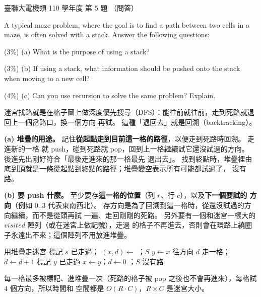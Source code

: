 \begin{pastexam}[label={px:ust-110-ee-ds-05}]{臺聯大電機類 110 學年度 第 5 題}
（問答）

A typical maze problem, where the goal is to find a path between two cells in a maze, is often solved
with a stack. Answer the following questions:

(3\%) (a) What is the purpose of using a stack?

(3\%) (b) If using a stack, what information should be pushed onto the stack when moving to a new cell?

(4\%) (c) Can you use recursion to solve the same problem? Explain.
\end{pastexam}

\begin{pastsoln}
迷宮找路就是在格子圖上做深度優先搜尋（DFS）：能往前就往前，走到死路就退回上一個岔路口，換一個方向
再試。 這種「退回去」就是回溯（backtracking）。

\textbf{(a) 堆疊的用途。} 記住\textbf{從起點走到目前這一格的路徑}，以便走到死路時回溯。 走進新的一格
就 push，碰到死路就 pop，回到上一格繼續試它還沒試過的方向。 後進先出剛好符合「最後走進來的那一格最先
退出去」。 找到終點時，堆疊裡由底到頂就是一條從起點到終點的路徑；堆疊變空表示所有可能都試過了，
沒有路。

\textbf{(b) 要 push 什麼。} 至少要存\textbf{這一格的位置}（列 $r$、行 $c$），以及\textbf{下一個要試的
方向}（例如 $0..3$ 代表東南西北）。 存方向是為了回溯到這一格時，從還沒試過的方向繼續，而不是從頭再試
一遍、走回剛剛的死路。 另外要有一個和迷宮一樣大的 $\mathit{visited}$ 陣列（或在迷宮上做記號），走過
的格子不再進去，否則會在環路上繞圈子永遠出不來；這個陣列不用放進堆疊。
\begin{pseudo}[unbreakable]{用堆疊走迷宮}
    \State 標記 $s$ 已走過；
        \State $(x, d) \gets$ 
            \State {}；\Return $S$ 
        \EndIf
            \State $y \gets x$ 往方向 $d$ 走一格；$d \gets d + 1$
                \State 標記 $y$ 已走過
                \State {} 
                \State $x \gets y$；$d \gets 0$
                    \State {}；\Return $S$
                \EndIf
            \EndIf
        \EndWhile
    \EndWhile
    \State \Return 沒有路
\EndFunction
\end{pseudo}
每一格最多被標記、進堆疊一次（死路的格子被 pop 之後也不會再進來），每格試 $4$ 個方向，所以時間和
空間都是 $O(R \cdot C)$，$R \times C$ 是迷宮大小。


\end{pastsoln}
